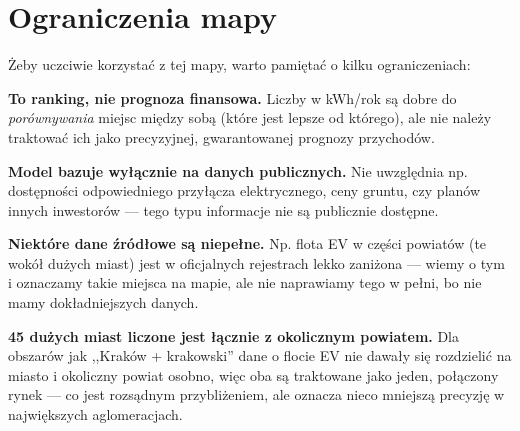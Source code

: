 \documentclass[11pt,a4paper]{article}
\begin{document}
	\section{Ograniczenia mapy}
	
	Żeby uczciwie korzystać z tej mapy, warto pamiętać o kilku
	ograniczeniach:
	
	\begin{infobox}
		\textbf{To ranking, nie prognoza finansowa.} Liczby w kWh/rok są dobre
		do \emph{porównywania} miejsc między sobą (które jest lepsze od
		którego), ale nie należy traktować ich jako precyzyjnej, gwarantowanej
		prognozy przychodów.
		
		\textbf{Model bazuje wyłącznie na danych publicznych.} Nie uwzględnia
		np. dostępności odpowiedniego przyłącza elektrycznego, ceny gruntu,
		czy planów innych inwestorów --- tego typu informacje nie są publicznie
		dostępne.
		
		\textbf{Niektóre dane źródłowe są niepełne.} Np. flota EV w części
		powiatów (te wokół dużych miast) jest w oficjalnych rejestrach lekko
		zaniżona --- wiemy o tym i oznaczamy takie miejsca na mapie, ale nie
		naprawiamy tego w pełni, bo nie mamy dokładniejszych danych.
		
		\textbf{45 dużych miast liczone jest łącznie z okolicznym powiatem.} Dla
		obszarów jak ,,Kraków + krakowski'' dane o flocie EV nie dawały się
		rozdzielić na miasto i okoliczny powiat osobno, więc oba są traktowane
		jako jeden, połączony rynek --- co jest rozsądnym przybliżeniem, ale
		oznacza nieco mniejszą precyzję w największych aglomeracjach.
	\end{infobox}

	
\end{document}
